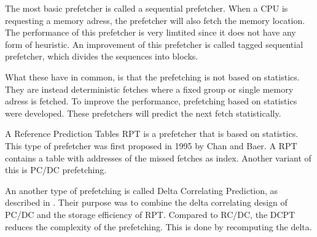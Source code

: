 The most basic prefetcher is called a sequential prefetcher. When a CPU is requesting a memory adress, the prefetcher will also fetch the memory location. The performance of this prefetcher is very limtited since it does not have any form of heuristic. An improvement of this prefetcher is called tagged sequential prefetcher, which divides the sequences into blocks.

What these have in common, is that the prefetching is not based on statistics. They are instead deterministic fetches where a fixed group or single memory adress is fetched. To improve the performance, prefetching based on statistics were developed. These prefetchers will predict the next fetch statistically.   

A Reference Prediction Tables RPT is a prefetcher that is based on statistics. This type of prefetcher was first proposed in 1995 by Chan and Baer. A RPT contains a table with addresses of the missed fetches as index. Another variant of this is PC/DC prefetching. 

An another type of prefetching is called Delta Correlating Prediction, as described in \cite{reference:jahre}. Their purpose was to combine the delta correlating design of PC/DC and the storage efficiency of RPT. Compared to RC/DC, the DCPT reduces the complexity of the prefetching. This is done by recomputing the delta.
